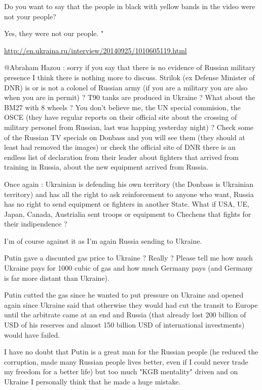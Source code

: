 \begin{itemize}
\begin{itemize}
Do you want to say that the people in black with yellow bands in the video were
not your people?

Yes, they were not our people. "

\url{http://en.ukraina.ru/interview/20140925/1010605119.html}


@Abraham Hazou : sorry if you say that there is no evidence of Russian military
presence I think there is nothing more to discuss. Strilok (ex Defense Minister
of DNR) is or is not a colonel of Russian army (if you are a military you are
also when you are in permit) ? T90 tanks are produced in Ukraine ? What about
the BM27 with 8 wheels ? You don't believe me, the UN special commision, the
OSCE (they have regular reports on their official site about the crossing of
military personel from Russian, last was happing yesterday night) ? Check some
of the Russian TV specials on Donbass and you will see them (they should at
least had removed the images) or check the official site of DNR there is an
endless list of declaration from their leader about fighters that arrived from
training in Russia, about the new equipment arrived from Russia. 

Once again : Ukrainian is defending his own territory (the Donbass is Ukrainian
territory) and has all the right to ask reinforcement to anyone who want,
Russia has no right to send equipment or fighters in another State. What if
USA, UE, Japan, Canada, Austrialia sent troops or equipment to Chechens that
fights for their indipendence ? 

I'm of course against it as I'm again Russia sending to Ukraine.

Putin gave a discunted gas price to Ukraine ? Really ? Please tell me how much
Ukraine pays for 1000 cubic of gas and how much Germany pays (and Germany is
far more distant than Ukraine). 

Putin cutted the gas since he wanted to put pressure on Ukraine and opened
again since Ukraine said that otherwise they would had cut the transit to
Europe until the arbitrate came at an end and Russia (that already lost 200
billion of USD of his reserves and almost 150 billion USD of international
investments) would have failed. 

I have no doubt that Putin is a great man for the Russian people (he reduced
the corruption, made many Russian people lives better, even if I could never
trade my freedom for a better life) but too much "KGB mentality" driven and on
Ukraine I personally think that he made a huge mistake. 


\end{itemize}
\end{itemize}
